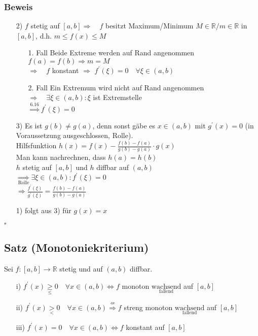\documentclass[12pt, titlepage]{article}
\newcommand{\R}{\mathds{R}}
\renewcommand{\>}{\rightarrow}
\renewcommand{\*}{\cdot}
\begin{document}
	\subsubsection*{Beweis}
	\begin{itemize}
		\item[2)] $f$ stetig auf $[a,b]\Rightarrow\quad f$ besitzt Maximum/Minimum $M\in\R/m\in\R$ in $[a,b]$, d.h. $m\leq f(x)\leq M$
		\begin{itemize}
			\item[1. Fall] Beide Extreme werden auf Rand angenommen\\
			$f(a)=f(b)\Rightarrow m=M$\\
			$\Rightarrow\quad f$ konstant $\Rightarrow$ $f^\prime(\xi)=0\quad\forall\xi\in(a,b)$
			\item[2. Fall] Ein Extremum wird nicht auf Rand angenommen\\
			$\Rightarrow\quad\exists\xi\in(a,b)\colon\xi$ ist Extremstelle\\
			$\overset{\textrm{6.16}}{\Rightarrow}f^\prime(\xi)=0$
		\end{itemize} 
		\item[3)] Es ist $g(b)\neq g(a)$, denn sonst gäbe es $x\in(a,b)$ mit $g^\prime(x)=0$ (in Voraussetzung ausgeschlossen, Rolle).\\
		Hilfsfunktion $h(x)=f(x)-\frac{f(b)-f(a)}{g(b)-g(a)}\*g(x)$\\
		Man kann nachrechnen, dass $h(a)=h(b)$\\
		$h$ stetig auf $[a,b]$ und $h$ diffbar auf $(a,b)$\\
		$\underset{\textrm{Rolle}}{\Rightarrow}\exists\xi\in(a,b)\colon f^\prime(\xi)=0$\\
		$\Rightarrow \frac{f^\prime(\xi)}{g^\prime(\xi)}=\frac{f(b)-f(a)}{g(b)-g(a)}$
		\item[1)] folgt aus 3) für $g(x)=x$
	\end{itemize}
	\hfill$\square$
	\subsection{Satz (Monotoniekriterium)}
	Sei $f\colon[a,b]\>\R$ stetig und auf $(a,b)$ diffbar.
	\begin{itemize}
		\item[i)] $f^\prime(x)\underset{\leq}{\geq}0\quad\forall x\in(a,b)\Leftrightarrow f$ monoton $\underset{\textrm{fallend}}{\textrm{wachsend}}$ auf $[a,b]$
		\item[ii)] $f^\prime(x)\underset{<}{>}0\quad\forall x\in(a,b) \overset{\nLeftarrow}{\Rightarrow} f$ streng monoton $\underset{\textrm{fallend}}{\textrm{wachsend}}$ auf $[a,b]$
		\item[iii)] $f^\prime(x)=0\quad\forall x\in(a,b)\Leftrightarrow f$ konstant auf $[a,b]$		
	\end{itemize}
\end{document}
